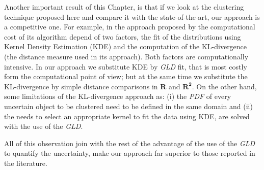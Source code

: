 Another important result of this Chapter, is that if we look at the clustering technique proposed here and compare it with the state-of-the-art, our approach is a competitive one. For example, in the approach proposed by \cite{Jiang} the computational cost of its algorithm depend of two factors, the fit of the distributions using Kernel Density Estimation (KDE) and the computation of the KL-divergence (the distance measure used in its approach). Both factors are computationally intensive. In our approach we substitute KDE by \textit{GLD} fit, that is most costly form the computational point of view; but at the same time we substitute the KL-divergence by simple distance comparisons in $\mathbf{R}$ and $\mathbf{R^2}$. On the other hand, some limitations of the KL-divergence approach as: (i) the \textit{PDF} of every uncertain object to be clustered need to be defined in the same domain and (ii) the needs to select an appropriate kernel to fit the data using KDE, are solved with the use of the \textit{GLD}.

All of this observation join with the rest of the advantage of the use of the \textit{GLD} to quantify the uncertainty, make our approach far superior to those reported in the literature.    


